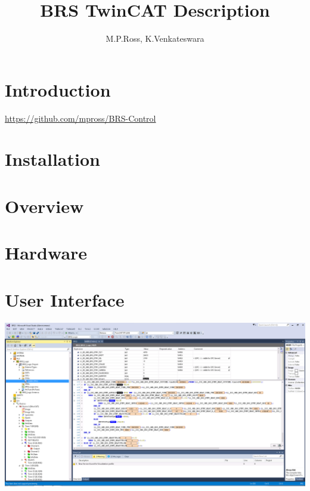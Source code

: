 \documentclass{article}
\title{BRS TwinCAT Description}
\author{M.P.Ross, K.Venkateswara}
\begin{document}
\maketitle
\section{Introduction}
\url{https://github.com/mpross/BRS-Control}
\section{Installation}
\section{Overview}
\section{Hardware}
\section{User Interface}
\includegraphics[width=\textwidth]{TwinCATScreen.png}
\end{document}
